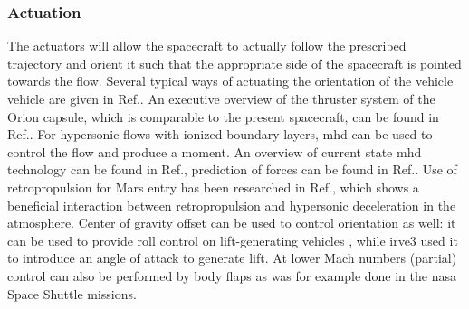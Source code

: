 \subsubsection{Actuation}
The actuators will allow the spacecraft to actually follow the prescribed trajectory and orient it such that the appropriate side of the spacecraft is pointed towards the flow. Several typical ways of actuating the orientation of the vehicle vehicle are given in Ref.\cite{Wertz2011}. An executive overview of the thruster system of the Orion capsule, which is comparable to the present spacecraft, can be found in Ref.\cite{Jones2012}. For hypersonic flows with ionized boundary layers, \gls{mhd} can be used to control the flow and produce a moment. An overview of current state \gls{mhd} technology can be found in Ref.\cite{Braun2009}, prediction of forces can be found in Ref.\cite{Kawamura2013}. Use of retropropulsion for Mars entry has been researched in Ref.\cite{Nise2011}, which shows a beneficial interaction between retropropulsion and hypersonic deceleration in the atmosphere. Center of gravity offset can be used to control orientation as well: it can be used to provide roll control on lift-generating vehicles \cite{Petsopoulos1996}, while \gls{irve3} used it to introduce an angle of attack to generate lift.\cite{Dillman2012a} At lower Mach numbers (partial) control can also be performed by body flaps as was for example done in the \gls{nasa} Space Shuttle missions.